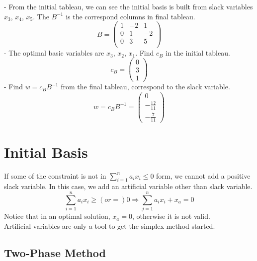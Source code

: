 					- From the initial tableau, we can see the initial basis is built from slack variables $x_3$, $x_4$, $x_5$. The $B^{-1}$ is the correspond columns in final tableau.
					\begin{equation}
						B = \left(\begin{matrix}
							1 & -2 & 1\\
							0 & 1 & -2\\
							0 & 3 & 5\\
						\end{matrix}\right) 
					\end{equation}
					- The optimal basic variables are $x_3$, $x_2$, $x_1$. Find $c_B$ in the initial tableau.
					\begin{equation}
						c_B = \left(\begin{matrix}
							0\\3\\1
						\end{matrix}\right) 
					\end{equation}
					- Find $w=c_BB^{-1}$ from the final tableau, correspond to the slack variable.
					\begin{equation}
						w = c_BB^{-1} = \left(\begin{matrix}
							0\\-\frac{12}{11}\\-\frac7{11}
						\end{matrix}\right) 
					\end{equation}

			\section{Initial Basis}
				If some of the constraint is not in $\sum_{i=1}^na_ix_i \le 0$ form, we cannot add a positive slack variable. In this case, we add an artificial variable other than slack variable.
				\begin{equation}
					\sum_{i=1}^n a_ix_i \ge (or =) 0 \Rightarrow \sum_{j=1}^n a_ix_i + x_a = 0 
				\end{equation}
				Notice that in an optimal solution, $x_a = 0$, otherwise it is not valid.\\
				Artificial variables are only a tool to get the simplex method started.
				\subsection{Two-Phase Method}
